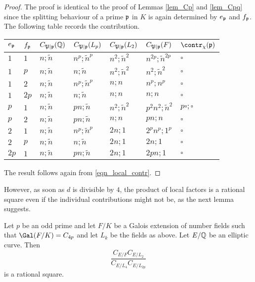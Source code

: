 \begin{proof}
    The proof is identical to the proof of Lemmas \ref*{lem_Cp} and \ref*{lem_Cpq} since the splitting behaviour of a prime $\mathfrak{p}$ in $K$ is again determined by $e_{\mathfrak{p}}$ and $f_{\mathfrak{p}}$. The following table records the contribution.

    \begin{table}[!ht]
        \centering
        \begin{tabular}{|l|l|l|l|l|l|l|}
        \hline
        $e_{\mathfrak{p}}$ & $f_{\mathfrak{p}}$  & $C_{\mathfrak{P}\mid \mathfrak{p}}(\mathbb{Q})$ & $C_{\mathfrak{P}\mid \mathfrak{p}}(L_p)$ & $C_{\mathfrak{P}\mid \mathfrak{p}}(L_2)$ & $C_{\mathfrak{P}\mid \mathfrak{p}}(F)$ & $\contr_\chi(\pp)$ \\ \hline
        $1$ & $1$ & $n;\tilde{n}$ & $n^p;\tilde{n}^p$ & $n^2;\tilde{n}^2$ & $n^{2p};\tilde{n}^{2p}$ & $\square$ \\ \hline
        $1$ & $p$ & $n;\tilde{n}$ & $n;\tilde{n}$ & $n^2;\tilde{n}^2$ & $n^2;\tilde{n}^2$ & $\square$ \\ \hline
        $1$ & $2$ & $n;\tilde{n}$ & $n^p;\tilde{n}^p$ & $n;n$ & $n^p;n^p$ & $\square$ \\ \hline
        $1$ & $2p$ & $n;\tilde{n}$ & $n;\tilde{n}$ & $n;n$ & $n;n$ & $\square$ \\ \hline
        $p$ & $1$ & $n;\tilde{n}$ & $pn;\tilde{n}$ & $n^2;\tilde{n}^2$ & $p^2n^2;\tilde{n}^2$ & $p\square;\square$ \\ \hline
        $p$ & $2$ & $n;\tilde{n}$ & $pn;\tilde{n}$ & $n;n$ & $pn;n$ & $\square$ \\ \hline
        $2$ & $1$ & $n;\tilde{n}$ & $n^p;\tilde{n}^p$ & $2n;1$ & $2^pn^p;1^p$ & $\square$ \\ \hline
        $2$ & $p$ & $n;\tilde{n}$ & $n;\tilde{n}$ & $2n;1$ & $2n;1$ & $\square$ \\ \hline
        $2p$ & $1$ & $n;\tilde{n}$ & $pn;\tilde{n}$ & $2n;1$ & $2pn;1$ & $\square$ \\ \hline
        \end{tabular}
    \end{table}
    The result follows again from \eqref{eqn_local_contr}.

\end{proof}

However, as soon as $d$ is divisible by $4$, the product of local factors is a rational square even if the individual contributions might not be, as the next lemma suggests. 

\begin{lemma}
    Let $p$ be an odd prime and let $F/K$ be a Galois extension of number fields such that $\Gal(F/K)=C_{4p}$ and let $L_k$ be the fields as above. Let $E/\mathbb{Q}$ be an elliptic curve. Then
    $$\frac{C_{E/F}C_{E/L_2}}{C_{E/L_4}C_{E/L_{2p}}}$$
    is a rational square.
\end{lemma}

